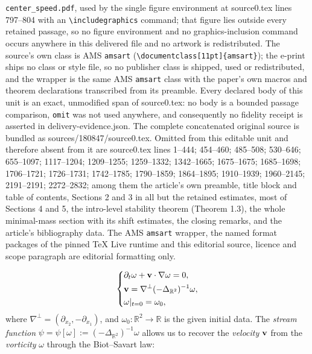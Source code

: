 \documentclass[10pt,a4paper]{amsart}
\theoremstyle{definition}
\theoremstyle{definition}
\numberwithin{equation}{section}
\newcommand{\0}{\emptyset}
\newcommand{\omg}{\omega}
\newcommand{\bfv}{{\bf v}}
\newcommand{\bbR}{\mathbb R}
\begin{document}
\texttt{center\_speed.pdf}, used by the single figure environment at source0.tex lines 797--804 with an \texttt{\textbackslash includegraphics} command; that figure lies outside every retained passage, so no figure environment and no graphics-inclusion command occurs anywhere in this delivered file and no artwork is redistributed. The source's own class is AMS \texttt{amsart} (\texttt{\textbackslash documentclass[11pt]\{amsart\}}); the e-print ships no class or style file, so no publisher class is shipped, used or redistributed, and the wrapper is the same AMS \texttt{amsart} class with the paper's own macros and theorem declarations transcribed from its preamble. Every declared body of this unit is an exact, unmodified span of source0.tex: no body is a bounded passage comparison, \texttt{omit} was not used anywhere, and consequently no fidelity receipt is asserted in delivery-evidence.json. The complete concatenated original source is bundled as sources/180847/source0.tex. Omitted from this editable unit and therefore absent from it are source0.tex lines 1--444; 454--460; 485--508; 530--646; 655--1097; 1117--1204; 1209--1255; 1259--1332; 1342--1665; 1675--1675; 1685--1698; 1706--1721; 1726--1731; 1742--1785; 1790--1859; 1864--1895; 1910--1939; 1960--2145; 2191--2191; 2272--2832; among them the article's own preamble, title block and table of contents, Sections 2 and 3 in all but the retained estimates, most of Sections 4 and 5, the intro-level stability theorem (Theorem 1.3), the whole minimal-mass section with its shift estimates, the closing remarks, and the article's bibliography data. The AMS \texttt{amsart} wrapper, the named format packages of the pinned TeX Live runtime and this editorial source, licence and scope paragraph are editorial formatting only.\par\smallskip
\setcounter{section}{1}
\setcounter{equation}{0}
\setcounter{theorem}{0}
	\begin{equation}\label{eq: Euler eq.}
		\left\{
		\begin{aligned}
			&\partial_{t} \omega + \bfv \cdot \nabla \omega = 0,\\
			&\bfv=\nabla^\perp(-\Delta_{\bbR^2})^{-1}\omega,\\
			&\omega|_{t=0} = \omega_{0},
		\end{aligned}
		\right.
	\end{equation} where $\nabla^\perp = (\partial_{x_2}, -\partial_{x_1})$, and $\omg_0:\bbR^2\to\bbR$ is the  given initial data. The \textit{stream function} $\psi=\psi[\omg]:=(-\Delta_{\bbR^2})^{-1}\omega$ allows us to recover the \textit{velocity} $\bfv$ from the \textit{vorticity} $\omega$ through the Biot--Savart law:
\end{document}
